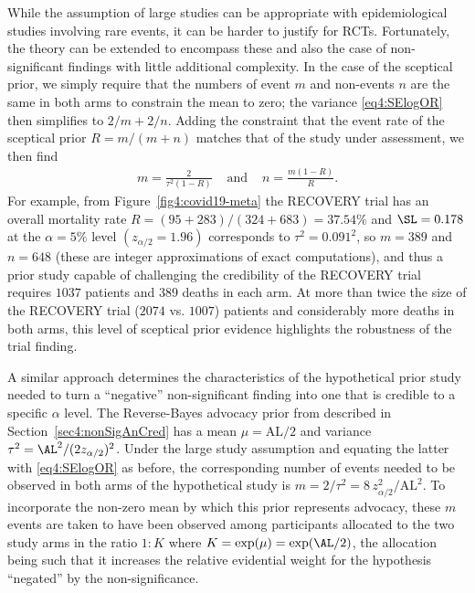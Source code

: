 While the assumption of large studies can be appropriate with epidemiological
studies involving rare events, it can be harder to justify for RCTs.
Fortunately, the theory can be extended to encompass these and also the case of
non-significant findings with little additional complexity. In the case of the
sceptical prior, we simply require that the numbers of event $m$ and non-events
$n$ are the same in both arms to constrain the mean to zero; the variance
\eqref{eq4:SElogOR} then simplifies to $2/m + 2/n$. Adding the constraint that
the event rate of the sceptical prior $R= m /(m + n)$ matches that of the study
under assessment, we then find
\begin{eqnarray*}
  m = \frac{2}{\tau^{2}(1 - R)} & \mbox{ and }
  &n = \frac{m(1 - R)}{R}.
\end{eqnarray*}
For example, from Figure~\ref{fig4:covid19-meta} the RECOVERY trial has an
overall mortality rate \mbox{$R=(95 + 283)/(324 + 683) = 37.54\%$} and
$\SL = 0.178$ at the $\alpha = 5\%$ level $(z_{\alpha/2} = 1.96)$ corresponds to
$\tau^2=0.091^2$, so $m = 389$ and $n = 648$ (these are integer approximations
of exact computations), and thus a prior study capable of challenging the
credibility of the RECOVERY trial requires $1037$ patients and $389$ deaths in
each arm. At more than twice the size of the RECOVERY trial ($2074$ vs. $1007$)
patients and considerably more deaths in both arms, this level of sceptical
prior evidence highlights the robustness of the trial finding.


A similar approach determines the characteristics of the hypothetical prior
study needed to turn a ``negative'' non-significant finding into one that is
credible to a specific $\alpha$ level. The Reverse-Bayes advocacy prior from
\citet{Matthews2018} described in Section~\ref{sec4:nonSigAnCred} has a mean
\mbox{$\mu = \mbox{AL}/2$} and variance $\tau^{2} = \AL^2/(2z_{\alpha/2})^2$.
Under the large study assumption and equating the latter with
\eqref{eq4:SElogOR} as before, the corresponding number of events needed to be
observed in both arms of the hypothetical study is
$m = 2/\tau^{2} = 8 \, z_{\alpha/2}^2/\mbox{AL}^2$. To incorporate the non-zero
mean by which this prior represents advocacy, these $m$ events are taken to have
been observed among participants allocated to the two study arms in the ratio
$1 \colon K$ where \mbox{$K = \exp(\mu) = \exp(\AL/2)$}, the allocation being
such that it increases the relative evidential weight for the hypothesis
``negated'' by the non-significance.


